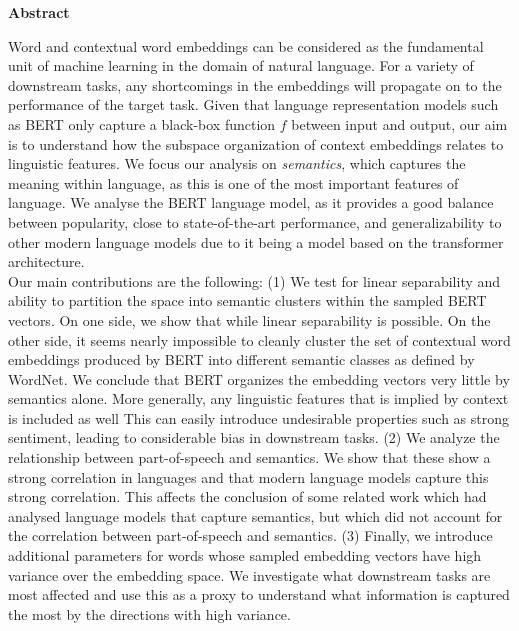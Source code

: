 \newpage
{\Huge \bf Abstract}
\vspace{24pt} 


Word and contextual word embeddings can be considered as the fundamental unit of machine learning in the domain of natural language.
For a variety of downstream tasks, any shortcomings in the embeddings will propagate on to the performance of the target task.
Given that language representation models such as BERT only capture a black-box function $f$ between input and output, our aim is to understand how the subspace organization of context embeddings relates to linguistic features.
We focus our analysis on \textit{semantics}, which captures the meaning within language, as this is one of the most important features of language. 
We analyse the BERT language model, as it provides a good balance between popularity, close to state-of-the-art performance, and generalizability to other modern language models due to it being a model based on the transformer architecture.
\\

Our main contributions are the following: (1) We test for linear separability and ability to partition the space into semantic clusters within the sampled BERT vectors.
On one side, we show that while linear separability is possible. 
On the other side, it seems nearly impossible to cleanly cluster the set of contextual word embeddings produced by BERT into different semantic classes as defined by WordNet.
We conclude that BERT organizes the embedding vectors very little by semantics alone.
More generally, any linguistic features that is implied by context is included as well
This can easily introduce undesirable properties such as strong sentiment, leading to considerable bias in downstream tasks.
(2) We analyze the relationship between part-of-speech and semantics. 
We show that these show a strong correlation in languages and that modern language models capture this strong correlation.
This affects the conclusion of some related work which had analysed language models that capture semantics, but which did not account for the correlation between part-of-speech and semantics.
(3) Finally, we introduce additional parameters for words whose sampled embedding vectors have high variance over the embedding space.
We investigate what downstream tasks are most affected  and use this as a proxy to understand what information is captured the most by the directions with high variance. \\

\newpage
\vspace*{\fill}
